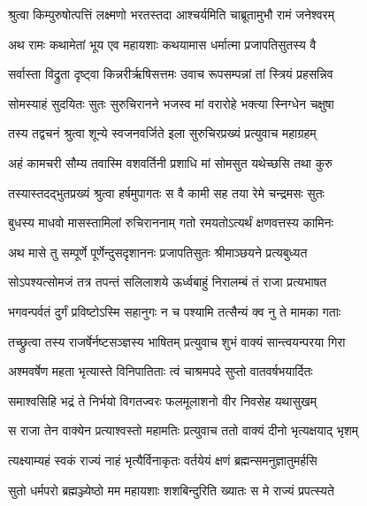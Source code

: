 
\twolineshloka
{श्रुत्वा किम्पुरुषोत्पत्तिं लक्ष्मणो भरतस्तदा}
{आश्चर्यमिति चाब्रूतामुभौ रामं जनेश्वरम्} %

\twolineshloka
{अथ रामः कथामेतां भूय एव महायशाः}
{कथयामास धर्मात्मा प्रजापतिसुतस्य वै} %

\twolineshloka
{सर्वास्ता विद्रुता दृष्ट्वा किन्नरीर्ऋषिसत्तमः}
{उवाच रूपसम्पन्नां तां स्त्रियं प्रहसन्निव} %

\twolineshloka
{सोमस्याहं सुदयितः सुतः सुरुचिरानने}
{भजस्व मां वरारोहे भक्त्या स्निग्धेन चक्षुषा} %

\twolineshloka
{तस्य तद्वचनं श्रुत्वा शून्ये स्वजनवर्जिते}
{इला सुरुचिरप्रख्यं प्रत्युवाच महाग्रहम्} %

\twolineshloka
{अहं कामचरी सौम्य तवास्मि वशवर्तिनी}
{प्रशाधि मां सोमसुत यथेच्छसि तथा कुरु} %

\twolineshloka
{तस्यास्तदद्भुतप्रख्यं श्रुत्वा हर्षमुपागतः}
{स वै कामी सह तया रेमे चन्द्रमसः सुतः} %

\twolineshloka
{बुधस्य माधवो मासस्तामिलां रुचिराननाम्}
{गतो रमयतोऽत्यर्थं क्षणवत्तस्य कामिनः} %

\twolineshloka
{अथ मासे तु सम्पूर्णे पूर्णेन्दुसदृशाननः}
{प्रजापतिसुतः श्रीमाञ्छयने प्रत्यबुध्यत} %

\twolineshloka
{सोऽपश्यत्सोमजं तत्र तपन्तं सलिलाशये}
{ऊर्ध्वबाहुं निरालम्बं तं राजा प्रत्यभाषत} %

\twolineshloka
{भगवन्पर्वतं दुर्गं प्रविष्टोऽस्मि सहानुगः}
{न च पश्यामि तत्सैन्यं क्व नु ते मामका गताः} %

\twolineshloka
{तच्छ्रुत्वा तस्य राजर्षेर्नष्टसञ्ज्ञस्य भाषितम्}
{प्रत्युवाच शुभं वाक्यं सान्त्वयन्परया गिरा} %

\twolineshloka
{अश्मवर्षेण महता भृत्यास्ते विनिपातिताः}
{त्वं चाश्रमपदे सुप्तो वातवर्षभयार्दितः} %

\twolineshloka
{समाश्वसिहि भद्रं ते निर्भयो विगतज्वरः}
{फलमूलाशनो वीर निवसेह यथासुखम्} %

\twolineshloka
{स राजा तेन वाक्येन प्रत्याश्वस्तो महामतिः}
{प्रत्युवाच ततो वाक्यं दीनो भृत्यक्षयाद् भृशम्} %

\twolineshloka
{त्यक्ष्याम्यहं स्वकं राज्यं नाहं भृत्यैर्विनाकृतः}
{वर्तयेयं क्षणं ब्रह्मन्समनुज्ञातुमर्हसि} %

\twolineshloka
{सुतो धर्मपरो ब्रह्मञ्ज्येष्ठो मम महायशाः}
{शशबिन्दुरिति ख्यातः स मे राज्यं प्रपत्स्यते} %

